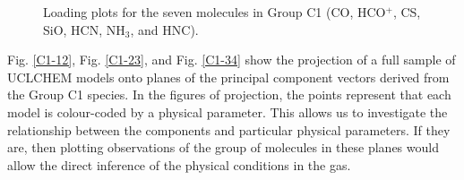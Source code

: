 \documentclass{aa}
\begin{document}
\begin{CJK*}{UTF8}{gbsn}
   
\begin{figure}[htbp]
\centering  
{}
\caption{Loading plots for the seven molecules in Group C1 (CO, HCO$^+$, CS, SiO, HCN, NH$_3$, and HNC).}
\label{Fig-7-loading}
\end{figure}

   
    Fig. \ref{C1-12}, Fig. \ref{C1-23}, and Fig. \ref{C1-34} show the projection of a full sample of UCLCHEM models onto planes of the principal component vectors derived from the Group C1 species. 
    In the figures of projection, the points represent that each model is colour-coded by a physical parameter. 
    This allows us to investigate the relationship between the components and particular physical parameters. 
    If they are, then plotting observations of the group of molecules in these planes would allow the direct inference of the physical conditions in the gas. 
    

\end{CJK*}
\end{document}
